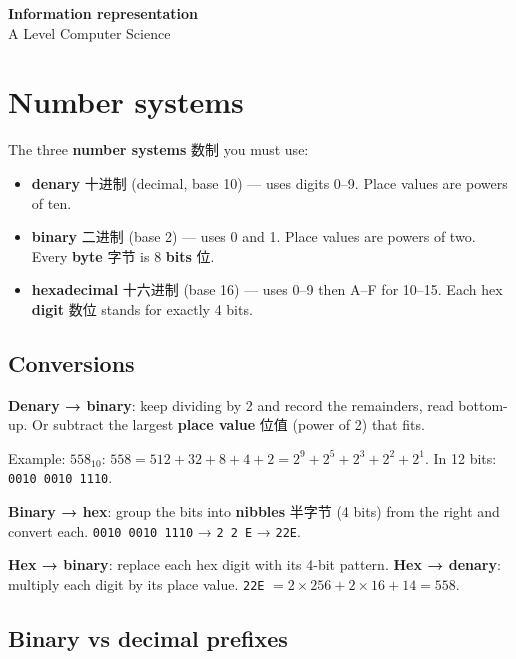 \documentclass[11pt]{article}
\begin{document}
\begin{center}
  {\LARGE\bfseries Information representation}\\[0.35em]
  {\large A Level Computer Science}
\end{center}
\vspace{0.6em}

\section*{Number systems}

The three \textbf{number systems} 数制 you must use:

\begin{itemize}
\item \textbf{denary} 十进制 (decimal, base 10) — uses digits 0–9. Place values are powers of ten.

\item \textbf{binary} 二进制 (base 2) — uses 0 and 1. Place values are powers of two. Every \textbf{byte} 字节 is 8 \textbf{bits} 位.

\item \textbf{hexadecimal} 十六进制 (base 16) — uses 0–9 then A–F for 10–15. Each hex \textbf{digit} 数位 stands for exactly 4 bits.

\end{itemize}

\subsection*{Conversions}

\textbf{Denary → binary}: keep dividing by 2 and record the remainders, read bottom-up. Or subtract the largest \textbf{place value} 位值 (power of 2) that fits.

Example: $558_{10}$: $558 = 512 + 32 + 8 + 4 + 2 = 2^{9} + 2^{5} + 2^{3} + 2^{2} + 2^{1}$. In 12 bits: \texttt{0010 0010 1110}.

\textbf{Binary → hex}: group the bits into \textbf{nibbles} 半字节 (4 bits) from the right and convert each. \texttt{0010 0010 1110} → \texttt{2 2 E} → \texttt{22E}.

\textbf{Hex → binary}: replace each hex digit with its 4-bit pattern. \textbf{Hex → denary}: multiply each digit by its place value. \texttt{22E} $= 2 \times 256 + 2 \times 16 + 14 = 558$.

\subsection*{Binary vs decimal prefixes}
\end{document}
